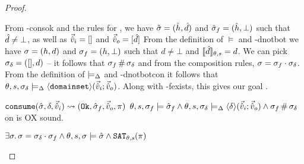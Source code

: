 \begin{proof}
\pfcase{$\delta = \domainset$}

\begin{hypvlist}
 From \hyp{consok} and the rules for \consume{}, we have $\hat{\sigma}=(\hat{h},\hat{d})$ and $\hat{\sigma}_f=(\hat{h},\bot)$ such that $\hat{d}\neq\bot$, as well as $\vec{\hat{v}}_i=[]$ and $\vec{\hat{v}}_o=[\hat{d}]$
 From the definition of $\models$ and \hyp{dnotbot} we have $\sigma=(h,d)$ and $\sigma_f=(h,\bot)$ such that $d\neq\bot$ and $\llbracket\hat{d}\rrbracket_{\theta,s}=d$.
 We can pick $\sigma_\delta=([],d)$ -- it follows that $\sigma_f\operatorname{\#}\sigma_\delta$ and from the composition rules, $\sigma=\sigma_f\cdot\sigma_\delta$.
 From the definition of $\models_{\Delta}$ and \hyp{dnotbotcon} it follows that $\theta,s,\sigma_\delta\models_{\Delta}\left<\texttt{domainset}\right>\!(\vec{\hat{v}}_i;\vec{\hat{v}}_o)$. Along with \hyp{fexists}, this gives our goal .
\end{hypvlist}


\pfassume \begin{hypvlist}
 $\texttt{consume}(\hat{\sigma},\delta,\vec{\hat{v}}_i)\rightsquigarrow (\texttt{Ok},\hat{\sigma}_f,\vec{\hat{v}}_o,\pi)$
 $\theta,s,\sigma_f\models \hat{\sigma}_f \land \theta, s, \sigma_\delta \models_{\Delta} \left<\delta\right>\!(\vec{\hat{v}}_i;\vec{\hat{v}}_o) \land \sigma_f\operatorname{\#}\sigma_\delta$
 \consume{} on \mmdl{} is OX sound.
\end{hypvlist}
\pfprove \begin{goalvlist}
 $\exists \sigma\ldotp \sigma = \sigma_\delta \cdot \sigma_f \land \theta,s,\sigma\models \hat{\sigma} \land \texttt{SAT}_{\mathit{\theta,s}}(\pi)$
\end{goalvlist}

\pfcase{$\delta \in \preds_\mmdl$}


\end{proof}
